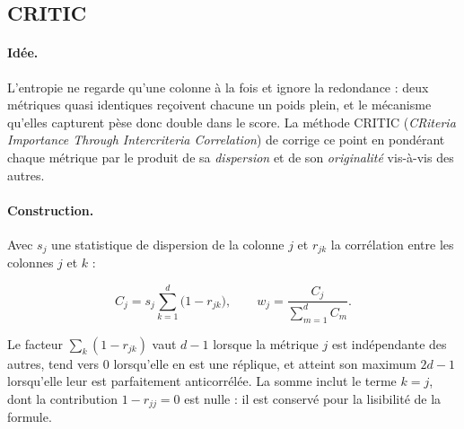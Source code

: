 \documentclass[11pt,a4paper]{article}
\theoremstyle{definition}
\theoremstyle{remark}
\begin{document}
\bigskip

\subsection{CRITIC}
\label{sec:critic}

\medskip

\paragraph{Idée.} L'entropie ne regarde qu'une colonne à la fois et ignore la redondance :
deux métriques quasi identiques reçoivent chacune un poids plein, et le mécanisme qu'elles
capturent pèse donc double dans le score. La méthode CRITIC (\emph{CRiteria Importance
Through Intercriteria Correlation}) de \citet{diakoulaki1995} corrige ce point en
pondérant chaque métrique par le produit de sa \emph{dispersion} et de son
\emph{originalité} vis-à-vis des autres.

\bigskip

\paragraph{Construction.} Avec $s_j$ une statistique de dispersion de la colonne $j$ et
$r_{jk}$ la corrélation entre les colonnes $j$ et $k$ :

\medskip

\[
  C_j = s_j \sum_{k=1}^{d}\big(1 - r_{jk}\big),
  \qquad
  w_j = \frac{C_j}{\sum_{m=1}^{d} C_m}.
\]

\bigskip

Le facteur $\sum_k (1 - r_{jk})$ vaut $d - 1$ lorsque la métrique $j$ est indépendante
des autres, tend vers $0$ lorsqu'elle en est une réplique, et atteint son maximum
$2d - 1$ lorsqu'elle leur est parfaitement anticorrélée. La somme inclut le terme
$k = j$, dont la contribution $1 - r_{jj} = 0$ est nulle : il est conservé pour la
lisibilité de la formule.

\medskip
\end{document}
